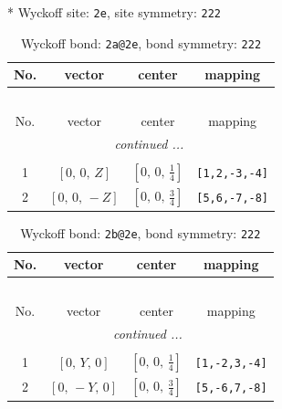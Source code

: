 \documentclass[fleqn,8pt]{jsarticle}
\begin{document}
* Wyckoff site: {\tt 2e}, site symmetry: {\tt 222}
\renewcommand{\arraystretch}{1.2}
\begin{longtable}{cccc}
\caption{Wyckoff bond: {\tt 2a@2e}, bond symmetry: {\tt 222}}
 \\
 \hline \hline
No. & vector & center & mapping \\ \hline \endfirsthead

\multicolumn{3}{l}{\tablename\ \thetable{}} \\
 \hline \hline
No. & vector & center & mapping \\ \hline \endhead

 \hline \hline
\multicolumn{3}{r}{\footnotesize\it continued ...} \\ \endfoot

 \hline \hline
\multicolumn{3}{r}{} \\ \endlastfoot

1 & $\left[ 0,\, 0,\, Z \right]$ & $\left[ 0,\, 0,\, \frac{1}{4} \right]$ & {\tt [1,2,-3,-4]} \\ \hline
2 & $\left[ 0,\, 0,\, - Z \right]$ & $\left[ 0,\, 0,\, \frac{3}{4} \right]$ & {\tt [5,6,-7,-8]} \\
\end{longtable}
\renewcommand{\arraystretch}{1.2}
\begin{longtable}{cccc}
\caption{Wyckoff bond: {\tt 2b@2e}, bond symmetry: {\tt 222}}
 \\
 \hline \hline
No. & vector & center & mapping \\ \hline \endfirsthead

\multicolumn{3}{l}{\tablename\ \thetable{}} \\
 \hline \hline
No. & vector & center & mapping \\ \hline \endhead

 \hline \hline
\multicolumn{3}{r}{\footnotesize\it continued ...} \\ \endfoot

 \hline \hline
\multicolumn{3}{r}{} \\ \endlastfoot

1 & $\left[ 0,\, Y,\, 0 \right]$ & $\left[ 0,\, 0,\, \frac{1}{4} \right]$ & {\tt [1,-2,3,-4]} \\ \hline
2 & $\left[ 0,\, - Y,\, 0 \right]$ & $\left[ 0,\, 0,\, \frac{3}{4} \right]$ & {\tt [5,-6,7,-8]} \\
\end{longtable}
\renewcommand{\arraystretch}{1.2}
\end{document}
